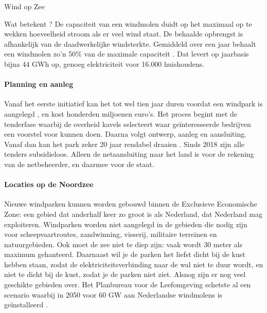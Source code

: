 \begin{voorstel}{Wind op Zee}
\begin{multicols}{2}
\begin{overwegingen}
\begin{infobox}{Wat betekent ?}
De capaciteit van een windmolen duidt op het maximaal op te wekken hoeveelheid stroom als er veel wind staat. De behaalde opbrengst is afhankelijk van de daadwerkelijke windsterkte. Gemiddeld over een jaar behaalt een windmolen zo’n 50\% van de maximale capaciteit \parencite{lensink_kosten_2017}. Dat levert op jaarbasis bijna 44 GWh op, genoeg elektriciteit voor 16.000 huishoudens.
\end{infobox}

\paragraph{Planning en aanleg}
Vanaf het eerste initiatief kan het tot wel tien jaar duren voordat een windpark is aangelegd \parencite{westra_offshore_2014}, en kost honderden miljoenen euro’s. Het proces begint met de tenderfase waarbij de overheid kavels selecteert waar geïnteresseerde bedrijven een voorstel voor kunnen doen. Daarna volgt ontwerp, aanleg en aansluiting. Vanaf dan kan het park zeker 20 jaar rendabel draaien \parencite{lensink_kosten_2017}. Sinds 2018 zijn alle tenders subsidieloos. Alleen de netaansluiting naar het land is voor de rekening van de netbeheerder, en daarmee voor de staat.

\paragraph{Locaties op de Noordzee}
Nieuwe windparken kunnen worden gebouwd binnen de Exclusieve Economische Zone: een gebied dat anderhalf keer zo groot is als Nederland, dat Nederland mag exploiteren. Windparken worden niet aangelegd in de gebieden die nodig zijn voor scheepvaartroutes, zandwinning, visserij, militaire terreinen en natuurgebieden. Ook moet de zee niet te diep zijn: vaak wordt 30 meter als maximum gehanteerd. Daarnaast wil je de parken het liefst dicht bij de kust hebben staan, zodat de elektriciteitsverbinding naar de wal niet te duur wordt, en niet te dicht bij de kust, zodat je de parken niet ziet. Alsnog zijn er nog veel geschikte gebieden over. Het Planbureau voor de Leefomgeving schetste al een scenario waarbij in 2050 voor 60 GW aan Nederlandse windmolens is geïnstalleerd \parencite{matthijsen_toekomst_2018}.


\end{overwegingen}
\end{multicols}
\end{voorstel}
